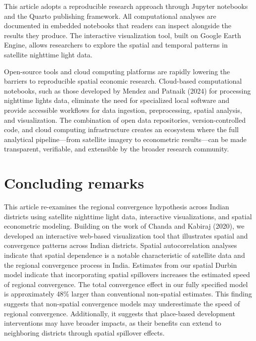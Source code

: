 \documentclass[
  letterpaper,
  DIV=11,
  numbers=noendperiod]{scrartcl}
\begin{document}
This article adopts a reproducible research approach through Jupyter
notebooks and the Quarto publishing framework. All computational
analyses are documented in embedded notebooks that readers can inspect
alongside the results they produce. The interactive visualization tool,
built on Google Earth Engine, allows researchers to explore the spatial
and temporal patterns in satellite nighttime light data.

Open-source tools and cloud computing platforms are rapidly lowering the
barriers to reproducible spatial economic research. Cloud-based
computational notebooks, such as those developed by Mendez and Patnaik
(2024) for processing nighttime lights data, eliminate the need for
specialized local software and provide accessible workflows for data
ingestion, preprocessing, spatial analysis, and visualization. The
combination of open data repositories, version-controlled code, and
cloud computing infrastructure creates an ecosystem where the full
analytical pipeline---from satellite imagery to econometric
results---can be made transparent, verifiable, and extensible by the
broader research community.

\section{Concluding remarks}\label{concluding-remarks}

This article re-examines the regional convergence hypothesis across
Indian districts using satellite nighttime light data, interactive
visualizations, and spatial econometric modeling. Building on the work
of Chanda and Kabiraj (2020), we developed an interactive web-based
visualization tool that illustrates spatial and convergence patterns
across Indian districts. Spatial autocorrelation analyses indicate that
spatial dependence is a notable characteristic of satellite data and the
regional convergence process in India. Estimates from our spatial Durbin
model indicate that incorporating spatial spillovers increases the
estimated speed of regional convergence. The total convergence effect in
our fully specified model is approximately 48\% larger than conventional
non-spatial estimates. This finding suggests that non-spatial
convergence models may underestimate the speed of regional convergence.
Additionally, it suggests that place-based development interventions may
have broader impacts, as their benefits can extend to neighboring
districts through spatial spillover effects.
\end{document}
